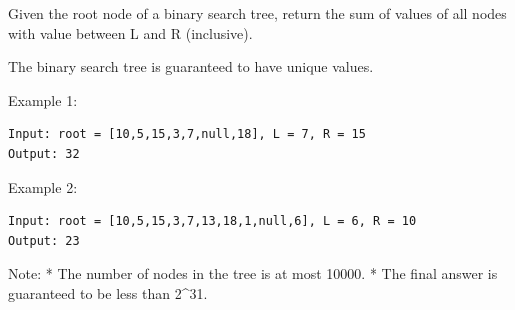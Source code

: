 \documentclass[11pt]{article}
\begin{document}
Given the root node of a binary search tree, return the sum of values of
all nodes with value between L and R (inclusive).

The binary search tree is guaranteed to have unique values.

Example 1:

\begin{verbatim}
Input: root = [10,5,15,3,7,null,18], L = 7, R = 15
Output: 32
\end{verbatim}

Example 2:

\begin{verbatim}
Input: root = [10,5,15,3,7,13,18,1,null,6], L = 6, R = 10
Output: 23
\end{verbatim}

Note: * The number of nodes in the tree is at most 10000. * The final
answer is guaranteed to be less than 2\^{}31.
\end{document}
